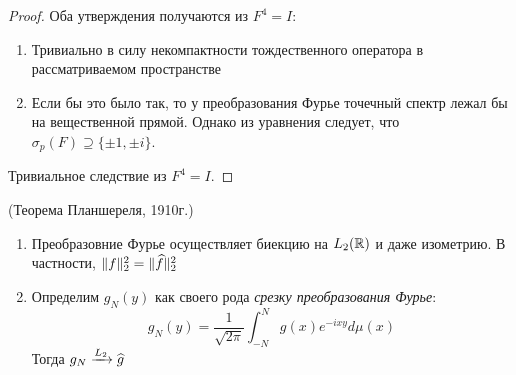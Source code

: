 \begin{proof}
	Оба утверждения получаются из $F^4 = I$:
	\begin{enumerate}
		\item Тривиально в силу некомпактности тождественного оператора в рассматриваемом пространстве
		
		\item Если бы это было так, то у преобразования Фурье точечный спектр лежал бы на вещественной прямой. Однако из уравнения следует, что $\sigma_p(F) \supseteq \{\pm 1, \pm i\}$.
	\end{enumerate}
	Тривиальное следствие из $F^4 = I$.
\end{proof}

\begin{proposition} (Теорема Планшереля, 1910г.)
	\begin{enumerate}
		\item Преобразовние Фурье осуществляет биекцию на $L_2(\mathbb{R})$ и даже изометрию. В частности, $\|f\|_2^2 = \|\widehat{f}\|_2^2$
		
		\item Определим $g_N(y)$ как своего рода \textit{срезку преобразования Фурье}:
		\[
			g_N(y) = \frac{1}{\sqrt{2\pi}} \int_{-N}^N g(x)e^{-ixy}d\mu(x)
		\]
		Тогда $g_N \xrightarrow[]{L_2} \widehat{g}$
	\end{enumerate}
\end{proposition}

